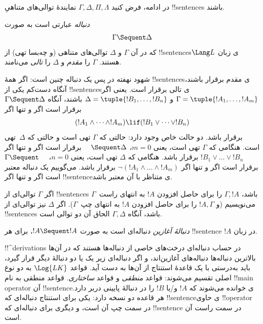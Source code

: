 \documentclass[../../../include/open-logic-section]{subfiles}
\begin{document}
      {}
      {}


در ادامه، فرض کنید $\Gamma, \Delta, \Pi, \Lambda$ نمایندهٔ توالی‌های
متناهیِ !!{sentence}s باشند.

\begin{defn}[دنباله]
\emph{دنباله} عبارتی است به صورت
\[
\Gamma \Sequent \Delta
\]
که در آن $\Gamma$ و $\Delta$ توالی‌های متناهی (و چه‌بسا تهی) از
!!{sentence}sی زبان $\Lang L$ هستند. $\Gamma$ را \emph{مقدم} و
$\Delta$ را \emph{تالی} می‌نامند.
\end{defn}

\begin{explain}
شهود نهفته در پس یک دنباله چنین است: اگر همهٔ !!{sentence}sی مقدم برقرار
باشند، آنگاه دست‌کم یکی از !!{sentence}sی تالی برقرار است. یعنی اگر
$\Gamma = \tuple{!A_1, \dots, !A_m}$ و
$\Delta = \tuple{!B_1, \dots, !B_n}$ باشند، آنگاه
$\Gamma \Sequent \Delta$ برقرار است اگر و تنها اگر
\[
(!A_1 \land \cdots \land !A_m) \lif (!B_1 \lor \cdots \lor
!B_n)
\]
برقرار باشد. دو حالت خاص وجود دارد: حالتی که $\Gamma$ تهی است و حالتی
که $\Delta$~تهی است. هنگامی که $\Gamma$ تهی است، یعنی $m = 0$،
$\quad \Sequent \Delta$ برقرار است اگر و تنها اگر
$!B_1 \lor \dots \lor !B_n$ برقرار باشد. هنگامی که $\Delta$ تهی است،
یعنی $n = 0$، $\Gamma \Sequent \quad$ برقرار است اگر و تنها اگر
$\lnot(!A_1 \land \dots \land !A_m)$ برقرار باشد. می‌گوییم یک دنباله
معتبر است اگر و تنها اگر !!{sentence}‌ی متناظر با آن معتبر باشد.
\end{explain}

اگر $\Gamma$ توالی‌ای از !!{sentence}s باشد، $\Gamma, !A$ را برای حاصل
افزودن $!A$ به انتهای راست~$\Gamma$ می‌نویسیم (و $!A, \Gamma$ را برای
حاصل افزودن $!A$ به انتهای چپ~$\Gamma$). اگر $\Delta$ نیز توالی‌ای از
!!{sentence}s باشد، آنگاه $\Gamma, \Delta$ الحاق آن دو توالی است.

\begin{defn}
\emph{دنبالهٔ آغازین} دنباله‌ای است
{به صورت $!A \Sequent !A$}، برای هر !!{sentence} $!A$ در زبان.
\end{defn}

!!^{derivation}s در حساب دنباله‌ای درخت‌های خاصی از دنباله‌ها هستند که
در آن‌ها بالاترین دنباله‌ها دنباله‌های آغازین‌اند، و اگر دنباله‌ای زیر
یک یا دو دنبالهٔ دیگر قرار گیرد، باید به‌درستی با یک قاعدهٔ استنتاج از
آن‌ها به دست آید. قواعد $\Log{LK}$ به دو نوع اصلی تقسیم می‌شوند: قواعد
\emph{منطقی} و قواعد \emph{ساختاری}. قواعد منطقی به نام !!{main
  operator} آن !!{sentence}‌ی خوانده می‌شوند که $!A$ و/یا $!B$ را در
دنبالهٔ پایینی دربر دارد. هر قاعده دو نسخه دارد: یکی برای استنتاج
دنباله‌ای که !!{sentence}‌ی حاوی !!{operator} در سمت چپ آن است، و دیگری
برای دنباله‌ای که !!{sentence} در سمت راست آن است.
\end{document}
